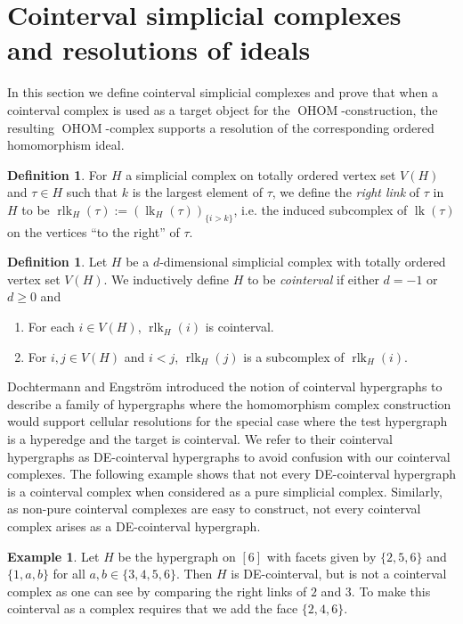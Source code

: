 \documentclass[11pt]{amsart}
\theoremstyle{definition}
\newtheorem{definition}[theorem]{Definition}
\newtheorem{example}[theorem]{Example}
\numberwithin{equation}{section}
\theoremstyle{remark}
\numberwithin{equation}{section}
\begin{document}
\section{Cointerval simplicial complexes and resolutions of ideals}\label{resolutions}

In this section we define cointerval simplicial complexes and prove that when a cointerval complex is used as a target object for the $\operatorname{OHOM}$-construction, the resulting $\operatorname{OHOM}$-complex supports a resolution of the corresponding ordered homomorphism ideal.

\begin{definition} For $H$ a simplicial complex on totally ordered vertex set $V(H)$ and $\tau \in H$ such that $k$ is the largest element of $\tau$, we define the \emph{right link} of $\tau$ in $H$ to be $\operatorname{rlk}_H(\tau) := (\operatorname{lk}_H(\tau))_{\{i > k\}}$, i.e. the induced subcomplex of $\operatorname{lk}(\tau)$ on the vertices ``to the right'' of $\tau$.
\end{definition}

\begin{definition} Let $H$ be a $d$-dimensional simplicial complex with totally ordered vertex set $V(H)$. 
We inductively define $H$ to be \emph{cointerval} if either $d =-1$ or $d \geq 0$ and
\begin{enumerate}
\item For each $i \in V(H)$, $\operatorname{rlk}_H(i)$ is cointerval.
\item For $i, j \in V(H)$ and $i < j$, $\operatorname{rlk}_H(j)$ is a subcomplex of $\operatorname{rlk}_H(i)$.
\end{enumerate}
\end{definition}

Dochtermann and Engstr\"{o}m \cite{DochtermannEngstromCellular} introduced the notion of cointerval hypergraphs to describe a family of hypergraphs where the homomorphism complex construction would support cellular resolutions for the special case where the test hypergraph is a hyperedge and the target is cointerval.
We refer to their cointerval hypergraphs as DE-cointerval hypergraphs to avoid confusion with our cointerval complexes.
The following example shows that not every DE-cointerval hypergraph is a cointerval complex when considered as a pure simplicial complex.
Similarly, as non-pure cointerval complexes are easy to construct, not every cointerval complex arises as a DE-cointerval hypergraph.

\begin{example}\label{equivalence}
Let $H$ be the hypergraph on $[6]$ with facets given by $\{2,5,6\}$ and $\{1,a,b\}$ for all $a,b \in \{3,4,5,6\}$.  
Then $H$ is DE-cointerval, but is not a cointerval complex as one can see by comparing the right links of $2$ and $3$.
To make this cointerval as a complex requires that we add the face $\{2,4,6\}$. 
\end{example}
\end{document}
